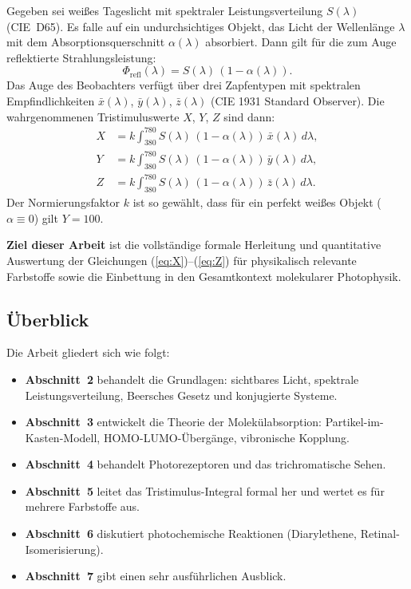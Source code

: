 ﻿\documentclass[a4paper,12pt]{article}
\theoremstyle{definition}
\begin{document}
Gegeben sei weißes Tageslicht mit spektraler Leistungsverteilung $S(\lambda)$ (CIE~D65).
Es falle auf ein undurchsichtiges Objekt, das Licht der Wellenlänge $\lambda$
mit dem Absorptionsquerschnitt $\alpha(\lambda)$ absorbiert. Dann gilt für die zum Auge
reflektierte Strahlungsleistung:
\[
  \Phi_{\mathrm{refl}}(\lambda) = S(\lambda)\,(1 - \alpha(\lambda)).
\]
Das Auge des Beobachters verfügt über drei Zapfentypen mit spektralen Empfindlichkeiten
$\bar{x}(\lambda)$, $\bar{y}(\lambda)$, $\bar{z}(\lambda)$ (CIE 1931 Standard Observer).
Die wahrgenommenen Tristimuluswerte $X$, $Y$, $Z$ sind dann:
\begin{align}
  X &= k \int_{380}^{780} S(\lambda)\,(1-\alpha(\lambda))\,\bar{x}(\lambda)\,d\lambda, \label{eq:X}\\
  Y &= k \int_{380}^{780} S(\lambda)\,(1-\alpha(\lambda))\,\bar{y}(\lambda)\,d\lambda, \label{eq:Y}\\
  Z &= k \int_{380}^{780} S(\lambda)\,(1-\alpha(\lambda))\,\bar{z}(\lambda)\,d\lambda. \label{eq:Z}
\end{align}
Der Normierungsfaktor $k$ ist so gewählt, dass für ein perfekt weißes Objekt ($\alpha \equiv 0$)
gilt $Y = 100$.

\textbf{Ziel dieser Arbeit} ist die vollständige formale Herleitung und quantitative Auswertung
der Gleichungen (\ref{eq:X})--(\ref{eq:Z}) für physikalisch relevante Farbstoffe sowie die
Einbettung in den Gesamtkontext molekularer Photophysik.

\subsection{Überblick}

Die Arbeit gliedert sich wie folgt:
\begin{itemize}
  \item \textbf{Abschnitt~2} behandelt die Grundlagen: sichtbares Licht, spektrale Leistungsverteilung, Beersches Gesetz und konjugierte Systeme.
  \item \textbf{Abschnitt~3} entwickelt die Theorie der Molekülabsorption: Partikel-im-Kasten-Modell, HOMO-LUMO-Übergänge, vibronische Kopplung.
  \item \textbf{Abschnitt~4} behandelt Photorezeptoren und das trichromatische Sehen.
  \item \textbf{Abschnitt~5} leitet das Tristimulus-Integral formal her und wertet es für mehrere Farbstoffe aus.
  \item \textbf{Abschnitt~6} diskutiert photochemische Reaktionen (Diarylethene, Retinal-Isomerisierung).
  \item \textbf{Abschnitt~7} gibt einen sehr ausführlichen Ausblick.
\end{itemize}
\end{document}
